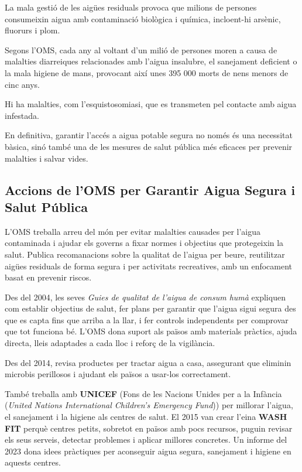 La mala gestió de les aigües residuals provoca que milions de persones consumeixin aigua amb contaminació biològica i química, incloent-hi arsènic, fluorurs i plom.

Segons l’OMS, cada any al voltant d’un milió de persones moren a causa de malalties diarreiques relacionades amb l’aigua insalubre, el sanejament deficient o la mala higiene de mans, provocant així unes 395 000 morts de nens menors de cinc anys.

Hi ha malalties, com l’esquistosomiasi, que es transmeten pel contacte amb aigua infestada.

En definitiva, garantir l’accés a aigua potable segura no només és una necessitat bàsica, sinó també una de les mesures de salut pública més eficaces per prevenir malalties i salvar vides.

\subsection{Accions de l’OMS per Garantir Aigua Segura i Salut Pública}
L’OMS treballa arreu del món per evitar malalties causades per l’aigua contaminada i ajudar els governs a fixar normes i objectius que protegeixin la salut. Publica recomanacions sobre la qualitat de l’aigua per beure, reutilitzar aigües residuals de forma segura i per activitats recreatives, amb un enfocament basat en prevenir riscos.

Des del 2004, les seves \textit{Guies de qualitat de l’aigua de consum humà} expliquen com establir objectius de salut, fer plans per garantir que l’aigua sigui segura des que es capta fins que arriba a la llar, i fer controls independents per comprovar que tot funciona bé. L’OMS dona suport als països amb materials pràctics, ajuda directa, lleis adaptades a cada lloc i reforç de la vigilància.

Des del 2014, revisa productes per tractar aigua a casa, assegurant que eliminin microbis perillosos i ajudant els països a usar-los correctament.

També treballa amb \textbf{UNICEF} (Fons de les Nacions Unides per a la Infància (\textit{United Nations International Children's Emergency Fund})) per millorar l’aigua, el sanejament i la higiene als centres de salut. El 2015 van crear l’eina \textbf{WASH FIT} perquè centres petits, sobretot en països amb pocs recursos, puguin revisar els seus serveis, detectar problemes i aplicar millores concretes. Un informe del 2023 dona idees pràctiques per aconseguir aigua segura, sanejament i higiene en aquests centres.

